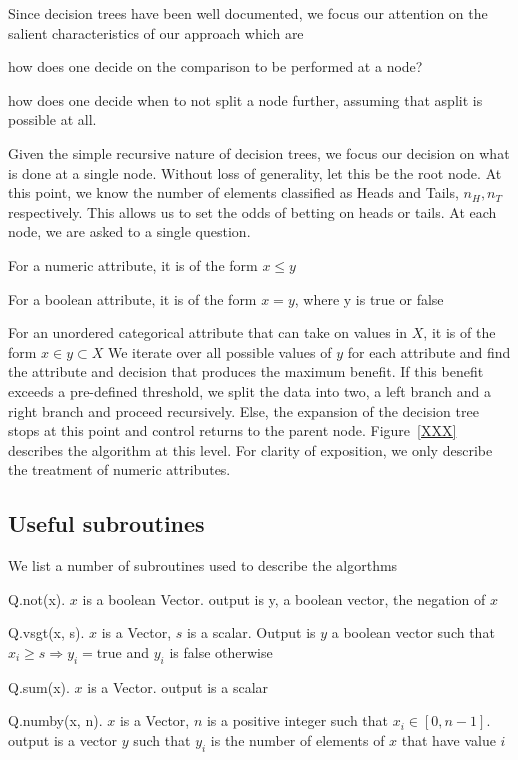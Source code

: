Since decision trees have been well documented, we focus our attention on the
salient characteristics of our approach which are
\be
\item how does one decide on the comparison to be performed at a node?
\item how does one decide when to not split a node further, assuming that asplit
is possible at all.
\ee

Given the simple recursive nature of decision trees, we focus our 
decision on what is done at a single node. Without loss of generality, 
let this be the root node. At this point, we know the number of elements
classified as Heads and Tails, \(n_H, n_T\) respectively. This allows us to set
the odds of betting on heads or tails. At each node, we are asked to a single
question. 
\bi
\item For a numeric attribute, it is of the form \(x \leq y\)
\item For a boolean attribute, it is of the form \(x = y\), where y is true or
false
\item For an unordered categorical attribute that can take on values in \(X\),
it is of the form \(x \in y \subset X\)
\ei
We iterate over all possible values of \(y\) for each attribute and find the
attribute and decision that produces the maximum benefit. If this benefit
exceeds a pre-defined threshold, we split the data into two, a left branch and a
right branch and proceed recursively. Else, the expansion of the decision tree
stops at this point and control returns to the parent node. 
Figure~\ref{XXX} describes the algorithm at this level. For clarity of 
exposition, we only describe the treatment of numeric attributes.


\subsection{Useful subroutines}
We list a number of subroutines used to describe the algorthms
\be
\item Q.not(x). \(x\) is a boolean Vector. output is y, a boolean vector, the
negation of \(x\)
\item Q.vsgt(x, s). \(x\) is a Vector, \(s\) is a scalar. Output is \(y\) a
boolean vector such that \(x_i \geq s \Rightarrow y_i = \mathrm{true}\) and
\(y_i\) is false otherwise
\item Q.sum(x). \(x\) is a Vector. output is a scalar
\item Q.numby(x, n). \(x\) is a Vector, \(n\) is a positive integer 
such that \(x_i \in [0, n-1]\). output is a vector \(y\) such that \(y_i\) is
the number of elements of \(x\) that have value \(i\)
\ee

